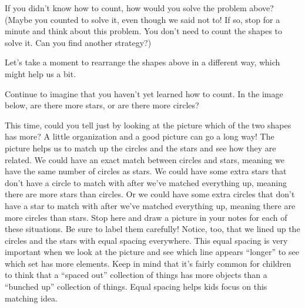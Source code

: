\documentclass{ximera}
\begin{document}
If you didn't know how to count, how would you solve the problem above? (Maybe you counted to solve it, 
even 
though we said not to! If so, stop for a minute and think about this problem. You don't need to count the 
shapes 
to solve it. Can you find another strategy?)

Let's take a moment to rearrange the shapes above in a different way, which might help us a bit.

\begin{question} \label{oneOneLine}
Continue to imagine that you haven't yet learned how to count. In the image below, are there more stars, or 
are there 
more circles?

\begin{center}
\end{center}

\begin{multipleChoice}
\end{multipleChoice}
\end{question}

This time, could you tell just by looking at the picture which of the two shapes has more? A little organization and a good picture can go a long way! The picture helps us to match up the circles and the stars and see how they are related. We could have an exact match between circles and stars, meaning we have the same number of circles as stars. We could have some extra stars that don't have a circle to match with after we've matched everything up, meaning there are more stars than circles. Or we could have some extra circles that don't have a star to match with after we've matched everything up, meaning there are more circles than stars. Stop here and draw a picture in your notes for each of these situations. Be sure to label them carefully! Notice, too, that we lined up the circles and the stars with equal spacing everywhere. This equal spacing is very important when we look at the picture and see which line appears ``longer'' to see which set has more elements. Keep in mind that it's fairly common for children to think that a ``spaced out'' collection of things has more objects than a ``bunched up'' collection of things. Equal spacing helps kids focus on this matching idea.
\end{document}
